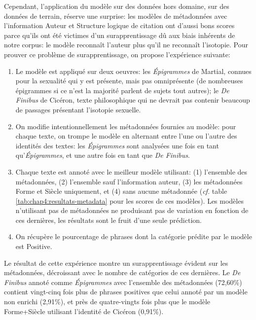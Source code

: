 Cependant, l'application du modèle sur des données hors domaine, sur des données de terrain, réserve une surprise: les modèles de métadonnées avec l'information Auteur et Structure logique de citation ont d'aussi bons scores parce qu'ils ont été victimes d'un surapprentissage dû aux biais inhérents de notre corpus: le modèle reconnaît l'auteur plus qu'il ne reconnaît l'isotopie. Pour prouver ce problème de surapprentissage, on propose l'expérience suivante:
\begin{enumerate}
    \item Le modèle est appliqué sur deux oeuvres: les \textit{Épigrammes} de Martial, connues pour la sexualité qui y est présente, mais pas omniprésente (de nombreuses épigrammes si ce n'est la majorité parlent de sujets tout autres); le \textit{De Finibus} de Cicéron, texte philosophique qui ne devrait pas contenir beaucoup de passages présentant l'isotopie sexuelle.
    \item On modifie intentionnellement les métadonnées fournies au modèle: pour chaque texte, on trompe le modèle en alternant entre l'une ou l'autre des identités des textes: les \textit{Épigrammes} sont analysées une fois en tant qu'\textit{Épigrammes}, et une autre fois en tant que \textit{De Finibus}.
    \item Chaque texte est annoté avec le meilleur modèle utilisant: (1) l'ensemble des métadonnées, (2) l'ensemble sauf l'information auteur, (3) les métadonnées Forme et Siècle uniquement, et (4) sans aucune métadonnée (\textit{cf.} table \ref{tab:chap4:resultats-metadata} pour les scores de ces modèles). Les modèles n'utilisant pas de métadonnées ne produisant pas de variation en fonction de ces dernières, les résultats sont le fruit d'une seule prédiction.
    \item On récupère le pourcentage de phrases dont la catégorie prédite par le modèle est Positive.
\end{enumerate}
Le résultat de cette expérience montre un surapprentissage évident sur les métadonnées, décroissant avec le nombre de catégories de ces dernières. Le \textit{De Finibus} annoté comme \textit{Épigrammes} avec l'ensemble des métadonnées (72,60\%) contient vingt-cinq fois plus de phrases positives que celui annoté   par un modèle non enrichi (2,91\%), et près de quatre-vingts fois plus que le modèle Forme+Siècle utilisant l'identité de Cicéron (0,91\%).

